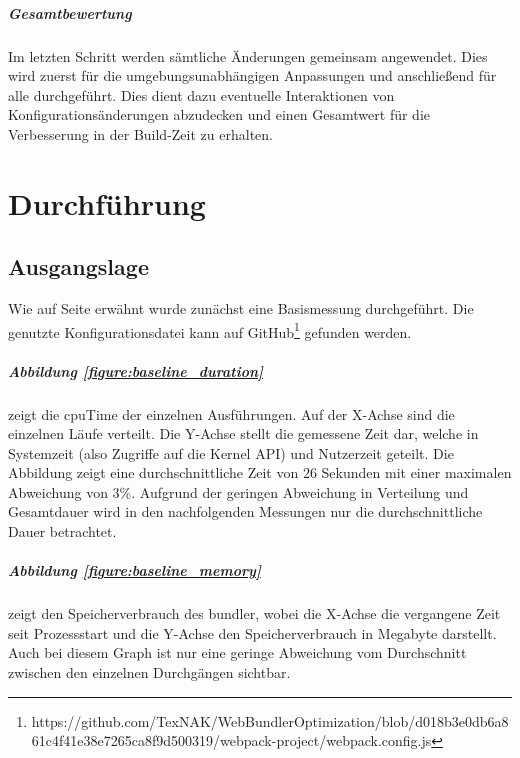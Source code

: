 \documentclass[11pt]{report}
\begin{document}
				\paragraph{Gesamtbewertung} Im letzten Schritt werden sämtliche Änderungen gemeinsam angewendet. Dies wird zuerst für die umgebungsunabhängigen Anpassungen und anschließend für alle durchgeführt. Dies dient dazu eventuelle Interaktionen von Konfigurationsänderungen abzudecken und einen Gesamtwert für die Verbesserung in der Build-Zeit zu erhalten.

	\clearpage

	\chapter{Durchführung}
		\section{Ausgangslage}
			Wie auf Seite \pageref{baseline-build} erwähnt wurde zunächst eine Basismessung durchgeführt. Die genutzte Konfigurationsdatei kann auf GitHub\footnote{https://github.com/TexNAK/WebBundlerOptimization/blob/d018b3e0db6a861c4f41e38e7265ca8f9d500319/webpack-project/webpack.config.js} gefunden werden.
			\paragraph{Abbildung \ref{figure:baseline_duration}} zeigt die \Gls{cpuTime} der einzelnen Ausführungen. Auf der X-Achse sind die einzelnen Läufe verteilt. Die Y-Achse stellt die gemessene Zeit dar, welche in Systemzeit (also Zugriffe auf die Kernel API) und Nutzerzeit geteilt. Die Abbildung zeigt eine durchschnittliche Zeit von $26$ Sekunden mit einer maximalen Abweichung von $3\%$. Aufgrund der geringen Abweichung in Verteilung und Gesamtdauer wird in den nachfolgenden Messungen nur die durchschnittliche Dauer betrachtet.
			\paragraph{Abbildung \ref{figure:baseline_memory}} zeigt den Speicherverbrauch des \Gls{bundler}, wobei die X-Achse die vergangene Zeit seit Prozessstart und die Y-Achse den Speicherverbrauch in Megabyte darstellt. Auch bei diesem Graph ist nur eine geringe Abweichung vom Durchschnitt zwischen den einzelnen Durchgängen sichtbar.
\end{document}
